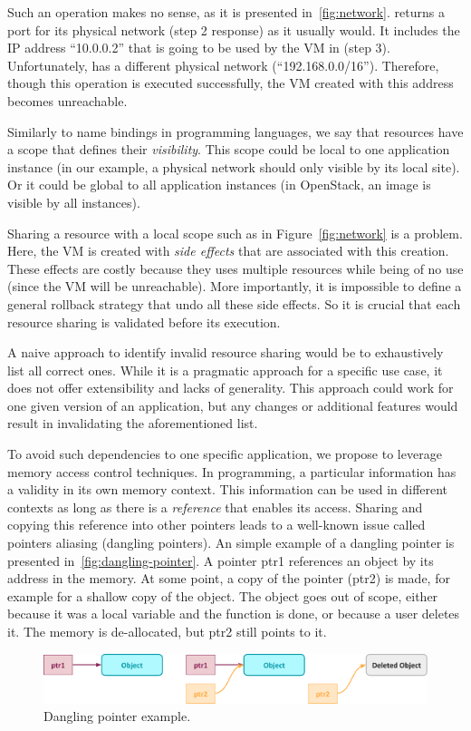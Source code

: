 Such an operation makes no sense, as it is presented
in~\autoref{fig:network}.
%
\sTwo returns a port for its physical network (step 2 response) as it
usually would.
%
It includes the IP address ``10.0.0.2'' that is going to be used by
the VM in \sOne (step 3).
%
Unfortunately, \sOne has a different physical network
(``192.168.0.0/16'').
%
Therefore, though this operation is executed successfully, the VM
created with this address becomes unreachable.


Similarly to name bindings in programming languages, we say that
resources have a scope that defines their \emph{visibility}.
%
This scope could be local to one application instance (\eg in our
example, a physical network should only visible by its local site).
%
Or it could be global to all application instances (\eg in OpenStack,
an image is visible by all instances).


Sharing a resource with a local scope such as in
Figure~\ref{fig:network} is a problem.
%
Here, the VM is created with \emph{side effects} that are associated
with this creation.
%
These effects are costly because they uses multiple resources while
being of no use (since the VM will be unreachable).
%
More importantly, it is impossible to define a general rollback
strategy that undo all these side effects.
%
So it is crucial that each resource sharing is validated before its
execution.

A naive approach to identify invalid resource sharing would be to
exhaustively list all correct ones.
%
While it is a pragmatic approach for a specific use case, it does not
offer extensibility and lacks of generality.
%
This approach could work for one given version of an application, but
any changes or additional features would result in invalidating the
aforementioned list.

To avoid such dependencies to one specific application, we propose to
leverage memory access control techniques.
%
In programming, a particular information has a validity in its own
memory context.
%
This information can be used in different contexts as long as there is
a \emph{reference} that enables its access.
%
Sharing and copying this reference into other pointers leads to a
well-known issue called pointers aliasing (\eg dangling pointers).
%
An simple example of a dangling pointer is presented
in~\autoref{fig:dangling-pointer}.
%
A pointer ptr1 references an object by its address in the memory.
%
At some point, a copy of the pointer (ptr2) is made, for example for a
shallow copy of the object.
%
The object goes out of scope, either because it was a local variable
and the function is done, or because a user deletes it.
%
The memory is de-allocated, but ptr2 still points to it.
\begin{figure}[htbp]
  \centering
  \includegraphics[width=.9\linewidth]{./figs/pdf/dangling-pointers.pdf}
  \caption{Dangling pointer example.}
  \label{fig:dangling-pointer}
\end{figure}

